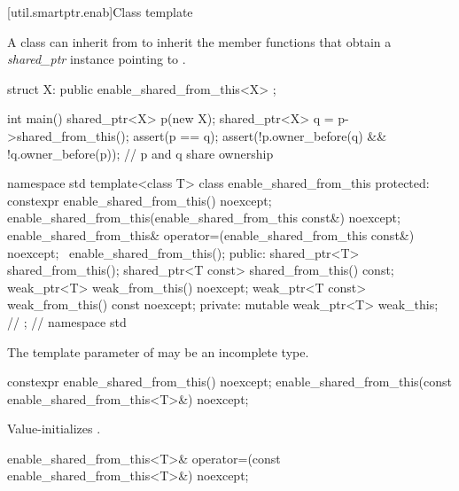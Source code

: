 [util.smartptr.enab]{Class template }

\pnum
{}%
A class  can inherit from 
to inherit the  member functions that obtain
a \textit{shared_ptr} instance pointing to .

\pnum
\enterexample

\begin{codeblock}
struct X: public enable_shared_from_this<X> {
};

int main() {
  shared_ptr<X> p(new X);
  shared_ptr<X> q = p->shared_from_this();
  assert(p == q);
  assert(!p.owner_before(q) && !q.owner_before(p)); // p and q share ownership
}
\end{codeblock}
\exitexample

\begin{codeblock}
namespace std {
  template<class T> class enable_shared_from_this {
  protected:
    constexpr enable_shared_from_this() noexcept;
    enable_shared_from_this(enable_shared_from_this const&) noexcept;
    enable_shared_from_this& operator=(enable_shared_from_this const&) noexcept;
    ~enable_shared_from_this();
  public:
    shared_ptr<T> shared_from_this();
    shared_ptr<T const> shared_from_this() const;
    weak_ptr<T> weak_from_this() noexcept;
    weak_ptr<T const> weak_from_this() const noexcept;
  private:
    mutable weak_ptr<T> weak_this; // \expos
  };
} // namespace std
\end{codeblock}

\pnum
The template parameter  of 
may be an incomplete type.

%
\begin{itemdecl}
constexpr enable_shared_from_this() noexcept;
enable_shared_from_this(const enable_shared_from_this<T>&) noexcept;
\end{itemdecl}

\begin{itemdescr}
\pnum\effects  Value-initializes .
\end{itemdescr}

%
%
\begin{itemdecl}
enable_shared_from_this<T>& operator=(const enable_shared_from_this<T>&) noexcept;
\end{itemdecl}

